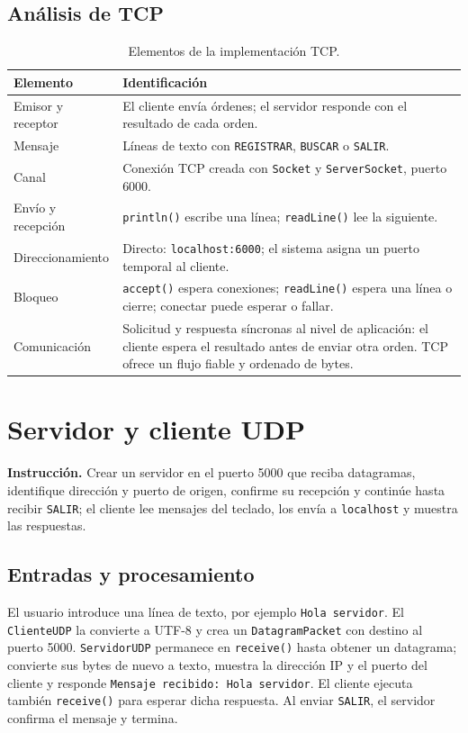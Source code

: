 \documentclass[12pt,oneside]{book}
\begin{document}
\section{Análisis de TCP}
\begin{table}[H]\centering\small
\caption{Elementos de la implementación TCP.}
\begin{tabularx}{\textwidth}{P{3.4cm} L}
\toprule
\textbf{Elemento} & \textbf{Identificación}\\\midrule
Emisor y receptor & El cliente envía órdenes; el servidor responde con el resultado de cada orden.\\
Mensaje & Líneas de texto con \texttt{REGISTRAR}, \texttt{BUSCAR} o \texttt{SALIR}.\\
Canal & Conexión TCP creada con \texttt{Socket} y \texttt{ServerSocket}, puerto 6000.\\
Envío y recepción & \texttt{println()} escribe una línea; \texttt{readLine()} lee la siguiente.\\
Direccionamiento & Directo: \texttt{localhost:6000}; el sistema asigna un puerto temporal al cliente.\\
Bloqueo & \texttt{accept()} espera conexiones; \texttt{readLine()} espera una línea o cierre; conectar puede esperar o fallar.\\
Comunicación & Solicitud y respuesta síncronas al nivel de aplicación: el cliente espera el resultado antes de enviar otra orden. TCP ofrece un flujo fiable y ordenado de bytes.\\
\bottomrule
\end{tabularx}
\end{table}

\chapter{Servidor y cliente UDP}
\textbf{Instrucción.} Crear un servidor en el puerto 5000 que reciba datagramas, identifique dirección y puerto de origen, confirme su recepción y continúe hasta recibir \texttt{SALIR}; el cliente lee mensajes del teclado, los envía a \texttt{localhost} y muestra las respuestas.

\section{Entradas y procesamiento}
El usuario introduce una línea de texto, por ejemplo \texttt{Hola servidor}. El \texttt{ClienteUDP} la convierte a UTF-8 y crea un \texttt{DatagramPacket} con destino al puerto 5000. \texttt{ServidorUDP} permanece en \texttt{receive()} hasta obtener un datagrama; convierte sus bytes de nuevo a texto, muestra la dirección IP y el puerto del cliente y responde \texttt{Mensaje recibido: Hola servidor}. El cliente ejecuta también \texttt{receive()} para esperar dicha respuesta. Al enviar \texttt{SALIR}, el servidor confirma el mensaje y termina.
\end{document}
